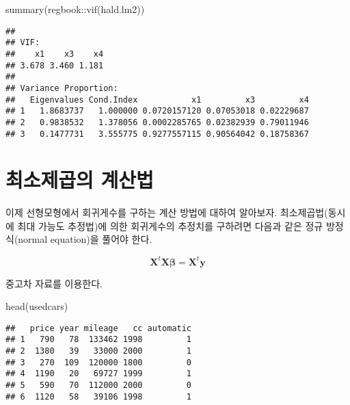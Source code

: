 \documentclass[
]{book}
\newenvironment{Shaded}{\begin{snugshade}}{\end{snugshade}}
\newcommand{\AttributeTok}[1]{\textcolor[rgb]{0.77,0.63,0.00}{#1}}
\newcommand{\FunctionTok}[1]{\textcolor[rgb]{0.00,0.00,0.00}{#1}}
\newcommand{\NormalTok}[1]{#1}
\newcommand{\OtherTok}[1]{\textcolor[rgb]{0.56,0.35,0.01}{#1}}
\newcommand{\SpecialCharTok}[1]{\textcolor[rgb]{0.00,0.00,0.00}{#1}}
\begin{document}
\begin{Shaded}
\begin{Highlighting}[]
\FunctionTok{summary}\NormalTok{(regbook}\SpecialCharTok{::}\FunctionTok{vif}\NormalTok{(hald.lm2))}
\end{Highlighting}
\end{Shaded}

\begin{verbatim}
## 
## VIF:
##    x1    x3    x4 
## 3.678 3.460 1.181 
## 
## Variance Proportion:
##   Eigenvalues Cond.Index           x1         x3         x4
## 1   1.8683737   1.000000 0.0720157120 0.07053018 0.02229687
## 2   0.9838532   1.378056 0.0002285765 0.02382939 0.79011946
## 3   0.1477731   3.555775 0.9277557115 0.90564042 0.18758367
\end{verbatim}

\hypertarget{compute}{%
\chapter{최소제곱의 계산법}\label{compute}}

이제 선형모형에서 회귀게수를 구하는 계산 방법에 대하여 알아보자. 최소제곱법(동시에 최대 가능도 추정법)에 의한 회귀게수의 추정치를 구하려면 다음과 같은 정규 방정식(normal equation)을 풀어야 한다.

\begin{equation}
 {\bm X}^t \bm X \bm \beta = \bm X^t \bm y
\label{eq:comp-lse}
\end{equation}

중고차 자료를 이용한다.

\begin{Shaded}
\begin{Highlighting}[]
\FunctionTok{head}\NormalTok{(usedcars)}
\end{Highlighting}
\end{Shaded}

\begin{verbatim}
##   price year mileage   cc automatic
## 1   790   78  133462 1998         1
## 2  1380   39   33000 2000         1
## 3   270  109  120000 1800         0
## 4  1190   20   69727 1999         1
## 5   590   70  112000 2000         0
## 6  1120   58   39106 1998         1
\end{verbatim}

\begin{Shaded}
\end{Shaded}
\end{document}
